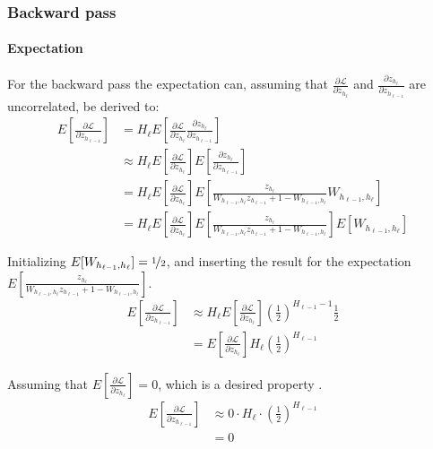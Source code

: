 \subsubsection{Backward pass}

\paragraph{Expectation} For the backward pass the expectation can, assuming that $\frac{\partial \mathcal{L}}{\partial z_{h_\ell}}$ and $\frac{\partial z_{h_\ell}}{\partial z_{h_{\ell-1}}}$ are uncorrelated, be derived to:
\begin{equation}
\begin{aligned}
E\left[\frac{\partial \mathcal{L}}{\partial z_{h_{\ell-1}}}\right]
&= H_\ell E\left[\frac{\partial \mathcal{L}}{\partial z_{h_\ell}} \frac{\partial z_{h_\ell}}{\partial z_{h_{\ell-1}}}\right] \\
&\approx H_\ell E\left[\frac{\partial \mathcal{L}}{\partial z_{h_\ell}}\right] E\left[\frac{\partial z_{h_\ell}}{\partial z_{h_{\ell-1}}}\right] \\
&= H_\ell E\left[\frac{\partial \mathcal{L}}{\partial z_{h_\ell}}\right] E\left[\frac{z_{h_\ell}}{W_{h_{\ell-1},h_\ell} z_{h_{\ell-1}} + 1 - W_{h_{\ell-1},h_\ell}} W_{h_{\ell-1},h_\ell}\right] \\
&= H_\ell E\left[\frac{\partial \mathcal{L}}{\partial z_{h_\ell}}\right] E\left[\frac{z_{h_\ell}}{W_{h_{\ell-1},h_\ell} z_{h_{\ell-1}} + 1 - W_{h_{\ell-1},h_\ell}}\right]E\left[W_{h_{\ell-1},h_\ell}\right]
\end{aligned}
\end{equation}

Initializing $E[W_{h_{\ell-1},h_\ell}] = \nicefrac{1}{2}$, and inserting the result for the expectation $E\left[\frac{z_{h_\ell}}{W_{h_{\ell-1},h_\ell} z_{h_{\ell-1}} + 1 - W_{h_{\ell-1},h_\ell}}\right]$.
\begin{equation}
\begin{aligned}
E\left[\frac{\partial \mathcal{L}}{\partial z_{h_{\ell-1}}}\right] &\approx H_\ell E\left[\frac{\partial \mathcal{L}}{\partial z_{h_\ell}}\right] \left(\frac{1}{2}\right)^{H_{\ell-1}-1} \frac{1}{2} \\
&= E\left[\frac{\partial \mathcal{L}}{\partial z_{h_\ell}}\right] H_\ell \left(\frac{1}{2}\right)^{H_{\ell-1}}
\end{aligned}
\end{equation}

Assuming that $E\left[\frac{\partial \mathcal{L}}{\partial z_{h_\ell}}\right] = 0$, which is a desired property \cite{glorot-initialization}.
\begin{equation}
\begin{aligned}
E\left[\frac{\partial \mathcal{L}}{\partial z_{h_{\ell-1}}}\right] &\approx 0 \cdot H_\ell \cdot \left(\frac{1}{2}\right)^{H_{\ell-1}} \\
&= 0
\end{aligned}
\end{equation}


